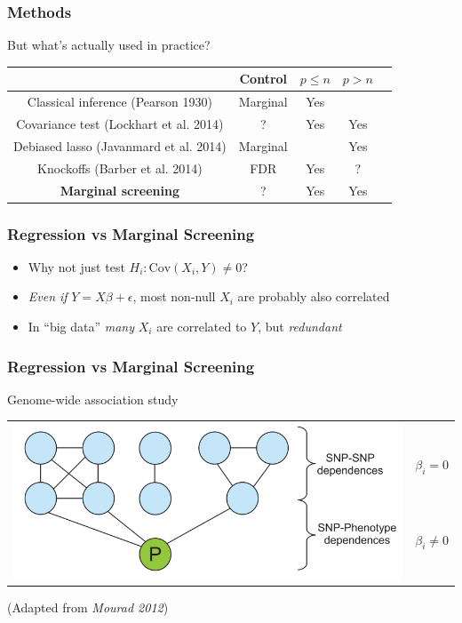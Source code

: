 \documentclass{beamer}
\newcommand{\Cov}{\text{Cov}}
\begin{document}
\begin{frame}
\frametitle{Methods}
But what's actually used in practice?
\begin{center}
\begin{tabular}{c|c|c|c|c}
 & Control & $p \leq n$ &  $p > n$\\ \hline
Classical inference (Pearson 1930) & Marginal & Yes & \\ \hline
Covariance test (Lockhart et al. 2014) &  ? & Yes & Yes\\ \hline
Debiased lasso (Javanmard et al. 2014) & Marginal & & Yes\\ \hline
Knockoffs (Barber et al. 2014) & FDR & Yes & ? \\ \hline
\textbf{Marginal screening} & ? & Yes & Yes \\ \hline
\end{tabular}
\end{center}
\end{frame}

\begin{frame}
\frametitle{Regression vs Marginal Screening}
\begin{itemize}
\item<1-> Why not just test $H_i: \Cov(X_i, Y) \neq 0$?
\item<1-> \emph{Even if} $Y = X\beta + \epsilon$, most non-null $X_i$ are probably also correlated
\item<2> In ``big data'' \emph{many} $X_i$ are correlated to $Y$, but \emph{redundant}
\end{itemize}
\end{frame}

\begin{frame}
\frametitle{Regression vs Marginal Screening}
Genome-wide association study
\begin{center}
\begin{tabular}{cc}
\multirow{5}{*}{\includegraphics[scale = 0.3]{pgm.png}} & \\
& $\beta_i = 0$\\
& \vspace{0.2in}\\
& $\beta_i \neq 0$\\
& \vspace{0.2in}\\
\end{tabular}
\end{center}
(Adapted from \emph{Mourad 2012})
\end{frame}
\end{document}
